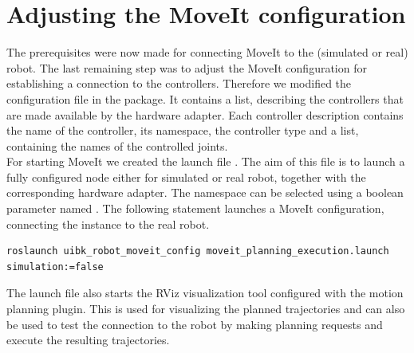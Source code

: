 \section{Adjusting the MoveIt configuration}

The prerequisites were now made for connecting MoveIt to the (simulated or real) robot. The last remaining step was to adjust the MoveIt configuration for establishing a connection to the  controllers. Therefore we modified the configuration file  in the  package. It contains a list, describing the controllers that are made available by the hardware adapter. Each controller description contains the name of the controller, its namespace, the controller type and a list, containing the names of the controlled joints.\\

For starting MoveIt we created the launch file . The aim of this file is to launch a fully configured  node either for simulated or real robot, together with the corresponding hardware adapter. The namespace can be selected using a boolean parameter named . The following statement launches a MoveIt configuration, connecting the  instance to the real robot.
{\small 
\begin{verbatim}
roslaunch uibk_robot_moveit_config moveit_planning_execution.launch simulation:=false
\end{verbatim}}
The launch file also starts the RViz visualization tool configured with the motion planning plugin. This is used for visualizing the planned trajectories and can also be used to test the connection to the robot by making planning requests and execute the resulting trajectories.